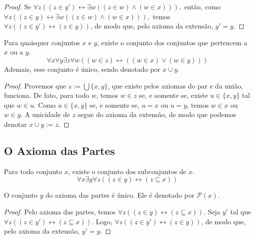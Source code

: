 \begin{proof}
    Se
        $
            \forall z ((z \in y') \leftrightarrow \exists w ( (z \in w) \land (w \in x))),
        $
    então, como
        $
            \forall z ((z \in y) \leftrightarrow \exists w ( (z \in w) \land (w \in x))),
        $
    temos $\forall z ((z \in y') \leftrightarrow (z \in y)) $, de modo que, pelo axioma da extensão, $y' = y$. \blackproof
\end{proof}

\begin{theorem}
    Para quaisquer conjuntos $x$ e $y$, existe o conjunto dos conjuntos que pertencem a $x$ ou a $y$.
        \[
            \forall x \forall y \exists z \forall w ((w \in z) \leftrightarrow ((w \in x) \lor (w \in y)))
        \]
    Ademais, esse conjunto é único, sendo denotado por $x \cup y$.
\end{theorem}

\begin{proof}
    Provemos que $z := \bigcup \{x,y\}$, que existe pelos axiomas do par e da união, funciona. De fato, para todo $w$, temos $w \in z$ se, e somente se, existe $u \in \{x,y \}$ tal que $w \in u$. Como $u \in \{ x,y \}$ se, e somente se, $u = x$ ou $u=y$, temos $w \in x$ ou $w \in y$. A unicidade de $z$ segue do axioma da extensão, de modo que podemos denotar $x \cup y := z$. \blackproof
\end{proof}

\subsection{O Axioma das Partes}

\begin{axiom} \label{ax:5}
    Para todo conjunto $x$, existe o conjunto dos subconjuntos de $x$.
        \[
            \boxed{
                \forall x \exists y \forall z ( (z \in y) \leftrightarrow (z \subseteq x) )
            }
        \]
\end{axiom}

\begin{proposition} \label{prop.set:extensaounico4}
    O conjunto $y$ do axioma das partes é único. Ele é denotado por $\mathcal{P}(x)$.
\end{proposition}

\begin{proof}
    Pelo axioma das partes, temos $\forall z ( (z \in y) \leftrightarrow (z \subseteq x) )$. Seja $y'$ tal que $\forall z ( (z \in y') \leftrightarrow (z \subseteq x) )$. Logo, $\forall z ((z \in y' )\leftrightarrow(z \in y))$, de modo que, pelo axioma da extensão, $y' = y$. \blackproof
\end{proof}

